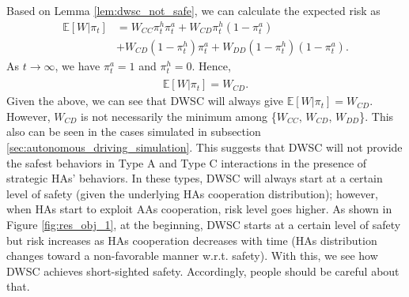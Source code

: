 \documentclass[letterpaper]{article} %
\newcommand{\yorie}[1]{\textcolor{cyan}{(Yorie:  #1)}}
\begin{document}
Based on Lemma \ref{lem:dwsc_not_safe}, we can calculate the expected risk as
\begin{align}
    \label{eq:risk_calc}
    \mathbb{E}[W|\pi_t]&=W_{CC}\pi^h_t\pi^a_t+W_{CD}\pi^h_t(1-\pi^a_t)\\ &+W_{CD}(1-\pi^h_t)\pi^a_t+W_{DD}(1-\pi^h_t)(1-\pi^a_t). \nonumber
\end{align}
As $t \xrightarrow[]{} \infty$,  we have $\pi^a_t = 1$ and $\pi^h_t = 0$. Hence,
\begin{align}
    \mathbb{E}[W|\pi_t]= W_{CD}.
\end{align}
Given the above, we can see that DWSC will always give $\mathbb{E}[W|\pi_t]= W_{CD}$. However, $W_{CD}$ is not necessarily the minimum among \{$W_{CC}$, $W_{CD}$, $W_{DD}$\}. This also can be seen in the cases simulated in subsection \ref{sec:autonomous_driving_simulation}. This suggests that DWSC will not provide the safest behaviors in Type A and Type C interactions in the presence of strategic HAs' behaviors. In these types, DWSC will always start at a certain level of safety (given the underlying HAs cooperation distribution); however, when HAs start to exploit AAs cooperation, risk level goes higher. As shown in Figure \ref{fig:res_obj_1}, at the beginning, DWSC starts at a certain level of safety but risk increases as HAs cooperation decreases with time (HAs distribution changes toward a non-favorable manner w.r.t. safety). With this, we see how DWSC achieves short-sighted safety. Accordingly, people should be careful about that.

\end{document}
